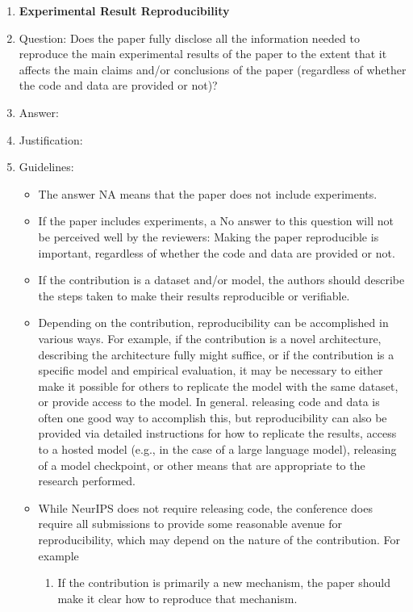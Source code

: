 \documentclass{article}
\begin{document}
\begin{enumerate}
    \item {\bf Experimental Result Reproducibility}
    \item[] Question: Does the paper fully disclose all the information needed to reproduce the main experimental results of the paper to the extent that it affects the main claims and/or conclusions of the paper (regardless of whether the code and data are provided or not)?
    \item[] Answer: \answerTODO{} %
    \item[] Justification: \justificationTODO{}
    \item[] Guidelines:
    \begin{itemize}
        \item The answer NA means that the paper does not include experiments.
        \item If the paper includes experiments, a No answer to this question will not be perceived well by the reviewers: Making the paper reproducible is important, regardless of whether the code and data are provided or not.
        \item If the contribution is a dataset and/or model, the authors should describe the steps taken to make their results reproducible or verifiable. 
        \item Depending on the contribution, reproducibility can be accomplished in various ways. For example, if the contribution is a novel architecture, describing the architecture fully might suffice, or if the contribution is a specific model and empirical evaluation, it may be necessary to either make it possible for others to replicate the model with the same dataset, or provide access to the model. In general. releasing code and data is often one good way to accomplish this, but reproducibility can also be provided via detailed instructions for how to replicate the results, access to a hosted model (e.g., in the case of a large language model), releasing of a model checkpoint, or other means that are appropriate to the research performed.
        \item While NeurIPS does not require releasing code, the conference does require all submissions to provide some reasonable avenue for reproducibility, which may depend on the nature of the contribution. For example
        \begin{enumerate}
            \item If the contribution is primarily a new mechanism, the paper should make it clear how to reproduce that mechanism.

\end{enumerate}
\end{itemize}
\end{enumerate}
\end{document}
